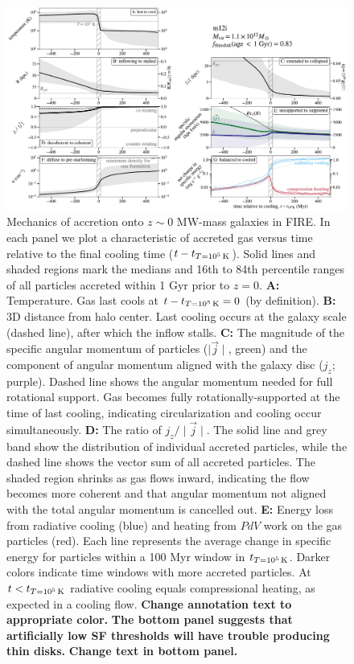\documentclass[fleqn,usenatbib]{mnras}
\newcommand{\tcon}{t_{T=10^5\,{\rm K}}}
\begin{document}
\begin{figure}
\includegraphics[width=\textwidth]{figures/before_and_after/before_and_after_m12i_md.pdf}
\caption{
Mechanics of accretion onto $z\sim0$ MW-mass galaxies in FIRE.
In each panel we plot a characteristic of accreted gas versus time relative to the final cooling time ($t - \tcon$).
Solid lines and shaded regions mark the medians and 16th to 84th percentile ranges of all particles accreted within 1 Gyr prior to $z=0$.
\textbf{A:} Temperature. Gas last cools at $t - \tcon = 0$ (by definition).
\textbf{B:}
3D distance from halo center. 
Last cooling occurs at the galaxy scale (dashed line), after which the inflow stalls.
\textbf{C:}
The magnitude of the specific angular momentum of particles ($\mid\vec{j}\mid$, green) and the component of angular momentum aligned with the galaxy disc ($j_z$; purple).
Dashed line shows the angular momentum needed for full rotational support.
Gas becomes fully rotationally-supported at the time of last cooling, indicating circularization and cooling occur simultaneously.
\textbf{D:}
The ratio of $j_z / \mid \vec j \mid$.
The solid line and grey band show the distribution of individual accreted particles, while the dashed line shows the vector sum of all accreted particles.
The shaded region shrinks as gas flows inward, indicating the flow becomes more coherent and that angular momentum not aligned with the total angular momentum is cancelled out. 
\textbf{E:}
Energy loss from radiative cooling (blue) and heating from $PdV$ work on the gas particles (red).
Each line represents the average change in specific energy for particles within a 100 Myr window in $\tcon$.
Darker colors indicate time windows with more accreted particles.
At $t<\tcon$ radiative cooling equals compressional heating, as expected in a cooling flow. 
\textbf{
Change annotation text to appropriate color.
}
\textbf{The bottom panel suggests that artificially low SF thresholds will have trouble producing thin disks.}
\textbf{Change text in bottom panel.}
}
\label{f: before and after}
\end{figure}
\end{document}
